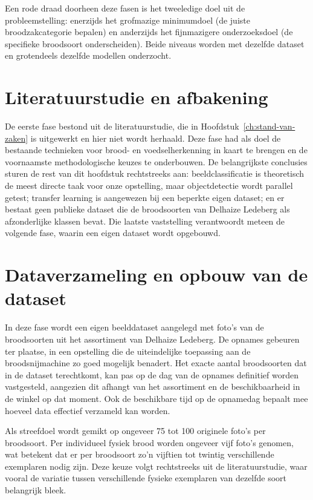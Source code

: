 Een rode draad doorheen deze fasen is het tweeledige doel uit de probleemstelling:
enerzijds het grofmazige minimumdoel (de juiste broodzakcategorie bepalen) en
anderzijds het fijnmazigere onderzoeksdoel (de specifieke broodsoort onderscheiden).
Beide niveaus worden met dezelfde dataset en grotendeels dezelfde modellen
onderzocht.

\section{Literatuurstudie en afbakening}

De eerste fase bestond uit de literatuurstudie, die in Hoofdstuk~\ref{ch:stand-van-zaken}
is uitgewerkt en hier niet wordt herhaald. Deze fase had als doel de bestaande
technieken voor brood- en voedselherkenning in kaart te brengen en de voornaamste
methodologische keuzes te onderbouwen. De belangrijkste conclusies sturen de rest
van dit hoofdstuk rechtstreeks aan: beeldclassificatie is theoretisch de meest
directe taak voor onze opstelling, maar objectdetectie wordt parallel getest;
transfer learning is aangewezen bij een beperkte eigen dataset; en er bestaat geen
publieke dataset die de broodsoorten van Delhaize Ledeberg als afzonderlijke klassen
bevat. Die laatste vaststelling verantwoordt meteen de volgende fase, waarin een
eigen dataset wordt opgebouwd.

\section{Dataverzameling en opbouw van de dataset}

In deze fase wordt een eigen beelddataset aangelegd met foto's van de broodsoorten
uit het assortiment van Delhaize Ledeberg. De opnames gebeuren ter plaatse, in een
opstelling die de uiteindelijke toepassing aan de broodsnijmachine zo goed mogelijk
benadert. Het exacte aantal broodsoorten dat in de dataset terechtkomt, kan pas op
de dag van de opnames definitief worden vastgesteld, aangezien dit afhangt van het
assortiment en de beschikbaarheid in de winkel op dat moment. Ook de beschikbare tijd
op de opnamedag bepaalt mee hoeveel data effectief verzameld kan worden.

Als streefdoel wordt gemikt op ongeveer 75 tot 100 originele foto's per broodsoort.
Per individueel fysiek brood worden ongeveer vijf foto's genomen, wat betekent dat er
per broodsoort zo'n vijftien tot twintig verschillende exemplaren nodig zijn. Deze
keuze volgt rechtstreeks uit de literatuurstudie, waar vooral de variatie tussen
verschillende fysieke exemplaren van dezelfde soort belangrijk bleek.

